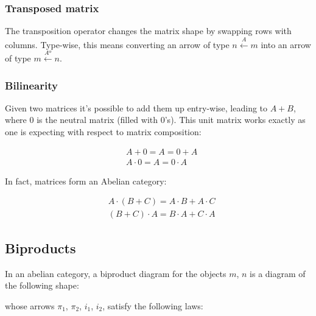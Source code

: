 \documentclass[
  oneside,
  11pt, a4paper,
  footinclude=true,
  headinclude=true,
  cleardoublepage=empty
]{scrbook}
\theoremstyle{definition}
\theoremstyle{definition}
\begin{document}
            \subsubsection{Transposed matrix} The transposition operator changes the matrix shape by swapping rows with columns. Type-wise, this means converting an arrow of type $n \xleftarrow{A} m$ into an arrow of type $m \xleftarrow{Aº} n$.
            
            \subsubsection{Bilinearity} Given two matrices it's possible to add them up entry-wise, leading to $A + B$, where $0$ is the neutral matrix (filled with $0$'s). This unit matrix works exactly as one is expecting with respect to matrix composition:
            
            \begin{align*}
                & A + 0 = A = 0 + A \\
                & A \cdot 0 = A = 0 \cdot A
            \end{align*}
            
            In fact, matrices form an Abelian category:
            
            \begin{align*}
                & A \cdot (B + C) = A \cdot B + A \cdot C\\
                & (B + C) \cdot A = B \cdot A + C \cdot A
            \end{align*}
    
        \subsection{Biproducts}
        
        In an abelian category, a biproduct diagram for the objects $m$, $n$ is a diagram of the following shape:
        
        \begin{center}
        \end{center}{}
        
        whose arrows $\pi_1$, $\pi_2$, $i_1$, $i_2$, satisfy the following laws:
        
\end{document}
